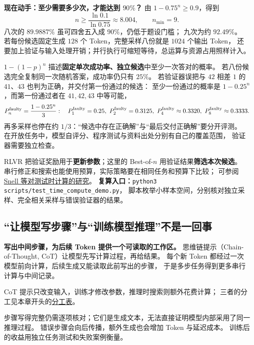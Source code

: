 

\textbf{现在动手：至少需要多少次，才能达到 $90\%$？}
由 $1-0.75^n\geq0.9$，得到
\[
n\geq\frac{\ln0.1}{\ln0.75}\approx8.004,
\qquad n_{\min}=9.
\]
八次的 $89.9887\%$ 虽可四舍五入成 $90\%$，仍低于题设门槛；
九次为约 $92.49\%$。
若每份候选固定生成 $128$ 个 Token，完整采样八份就是 $1024$ 个输出 Token，
还要加上验证与输入处理开销；并行执行可缩短等待，总运算与资源占用照样计入。

\begin{boundarybox}
$1-(1-p)^n$ 描述\textbf{固定单次成功率、独立候选}中至少一次答对的概率。
若八份候选完全复制同一次随机答案，成功率仍只有 $25\%$。
若验证器误把与 $42$ 相差 $1$ 的 $41$、$43$ 也判为正确，并交付第一份通过的候选：
至少一份通过的概率是 $1-0.25^n$，而第一份通过者在 $41,42,43$ 中等可能，
\[
P^{\rm faulty}_n=\frac{1-0.25^n}{3}:\quad
P^{\rm faulty}_1=0.25,\ P^{\rm faulty}_2=0.3125,\ P^{\rm faulty}_4\approx0.3320,\ P^{\rm faulty}_8\approx0.3333.
\]
再多采样也停在约 $1/3$：“候选中存在正确解”与“最后交付正确解”要分开评测。
在开放任务中，模型自评分、程序测试与资料出处分别有自己的覆盖范围，
验证器需要独立检查。
\end{boundarybox}

RLVR 把验证奖励用于\textbf{更新参数}；这里的 Best-of-$n$ 用验证结果\textbf{筛选本次候选}。
串行修正和搜索也能使用预算，实际策略要在相同任务和预算下比较；
可参阅 \href{https://arxiv.org/abs/2408.03314}{Snell 等对测试时计算的研究}。
\textbf{复算入口：}\texttt{python3 scripts/test\_time\_compute\_demo.py}，
脚本枚举小样本空间，分别核对独立采样、完全相关采样与错误验证器的结果。


\subsection{“让模型写步骤”与“训练模型推理”不是一回事}
\label{concept:cot-prompt}

\textbf{写出中间步骤，为后续 Token 提供一个可读取的工作区。}
思维链提示（Chain-of-Thought, CoT）让模型先写计算过程，再给结果。
每个新 Token 都经过一次模型前向计算，后续生成又能读取此前写出的步骤，
于是多步任务得到更多串行计算与中间记录。

CoT 提示只改变输入，训练才修改参数，推理时搜索则额外花费计算；
三者的分工见本章开头的\hyperref[sec:training-inference-roles]{分工表}。

\begin{boundarybox}
步骤写得完整仍需逐项核对；它们是生成文本，无法直接证明模型内部采用了同一推理过程。
错误步骤会向后传播，额外生成也会增加 Token 与延迟成本。
训练后的收益用独立任务测试和失败案例衡量。
\end{boundarybox}

